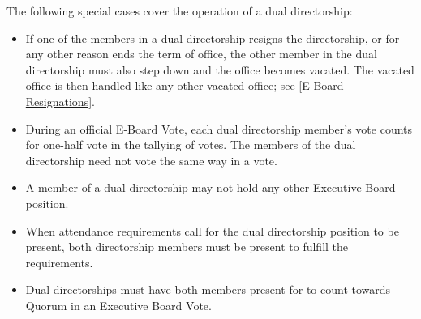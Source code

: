 \documentclass{article}
\begin{document}
The following special cases cover the operation of a dual directorship:
\begin{itemize}
	\item If one of the members in a dual directorship resigns the directorship, or for any other reason ends the term of office, the other member in the dual directorship must also step down and the office becomes vacated.
		The vacated office is then handled like any other vacated office; see \ref{E-Board Resignations}.
	\item During an official E-Board Vote, each dual directorship member's vote counts for one-half vote in the tallying of votes.
		The members of the dual directorship need not vote the same way in a vote.
	\item A member of a dual directorship may not hold any other Executive Board position.
	\item When attendance requirements call for the dual directorship position to be present, both directorship members must be present to fulfill the requirements.
	\item Dual directorships must have both members present for to count towards Quorum in an Executive Board Vote.
\end{itemize}
\end{document}
